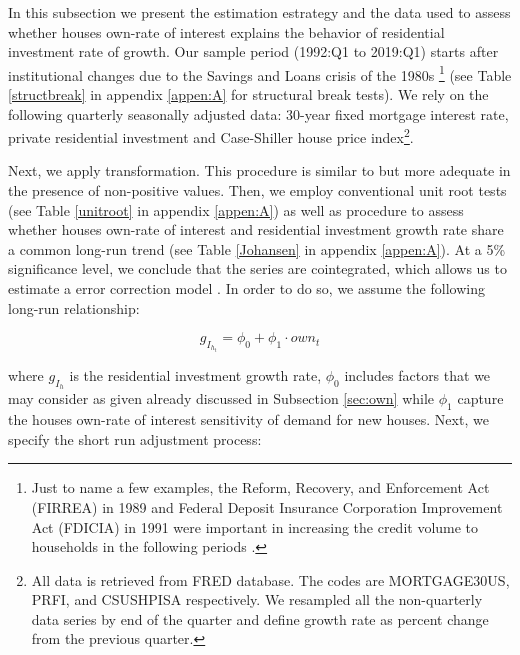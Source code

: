\documentclass[12pt, a4paper]{article}
\begin{document}
In this subsection we present the estimation estrategy and the data used to assess whether houses own-rate of interest explains the behavior of residential investment rate of growth.
Our sample period (1992:Q1 to 2019:Q1) starts after institutional changes due to the Savings and Loans crisis of the 1980s \footnote{Just to name a few examples, the Reform, Recovery, and Enforcement Act (FIRREA) in 1989 and Federal Deposit Insurance Corporation Improvement Act (FDICIA) in 1991 were important in increasing the credit volume to households in the following periods \cite{wall_too_2010}.} (see Table \ref{structbreak} in appendix \ref{appen:A} for structural break tests).
We rely on the following  quarterly seasonally adjusted data: 30-year fixed mortgage interest rate, private residential investment and Case-Shiller house price index\footnote{All data is retrieved from FRED database. The codes are MORTGAGE30US, PRFI, and CSUSHPISA respectively. We resampled all the non-quarterly data series by end of the quarter and define growth rate as percent change from the previous quarter.}.


Next, we apply \textcite{yeo_new_2000} transformation.
This procedure is similar to \textcite{box_analysis_1964} but more adequate in the presence of non-positive values.
Then, we employ conventional unit root tests (see Table \ref{unitroot} in appendix \ref{appen:A}) as well as \textcite{johansen_estimation_1991} procedure to assess whether houses own-rate of interest and residential investment growth rate share a common long-run trend (see Table \ref{Johansen} in appendix \ref{appen:A}).
At a 5\% significance level, we conclude that the series are cointegrated, which allows us to estimate a error correction model \cite{enders_applied_2014}.
In order to do so, we assume the following long-run relationship:

\begin{latex}
\begin{equation}
\label{gihLR}
g_{I_{h_{t}}} = \phi_{0} + \phi_{1}\cdot own_{t}
\end{equation}
\end{latex}
where \(g_{I_{h}}\) is the residential investment growth rate, \(\phi_0\) includes factors that we may consider as given already discussed in Subsection \ref{sec:own} while \(\phi_1\) capture the houses own-rate of interest sensitivity of demand for new houses.
Next, we specify the short run adjustment process:
\end{document}
